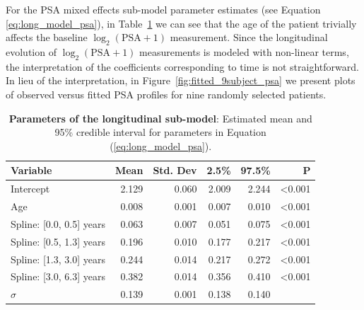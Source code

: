 For the PSA mixed effects sub-model parameter estimates (see Equation \ref{eq:long_model_psa}), in Table~\ref{tab:PSA_long} we can see that the age of the patient trivially affects the baseline ${\log_2(\mbox{PSA} + 1)}$ measurement. Since the longitudinal evolution of ${\log_2 (\mbox{PSA} + 1)}$ measurements is modeled with non-linear terms, the interpretation of the coefficients corresponding to time is not straightforward. In lieu of the interpretation, in Figure~\ref{fig:fitted_9subject_psa} we present plots of observed versus fitted PSA profiles for nine randomly selected patients. 
\begin{table}
\small\sf\centering
\caption{\textbf{Parameters of the longitudinal sub-model}: Estimated mean and 95\% credible interval for parameters in Equation (\ref{eq:long_model_psa}).}
\label{tab:PSA_long}
\begin{tabular}{lrrrrr}
\hline
Variable                         & Mean & Std. Dev & 2.5\%  & 97.5\% & P     \\
\hline
Intercept & 2.129    & 0.060  & 2.009 & 2.244 & \textless0.001 \\
Age & 0.008    & 0.001 & 0.007 & 0.010   &\textless0.001 \\
Spline: [0.0, 0.5] years & 0.063    & 0.007 & 0.051 & 0.075  & \textless0.001 \\
Spline: [0.5, 1.3] years & 0.196    & 0.010  & 0.177 & 0.217  & \textless0.001 \\
Spline: [1.3, 3.0] years & 0.244    & 0.014 & 0.217 & 0.272  & \textless0.001 \\
Spline: [3.0, 6.3] years & 0.382    & 0.014 & 0.356 & 0.410 &  \textless0.001 \\
$\sigma$ & 0.139    & 0.001 & 0.138 & 0.140  & \\
\hline
\end{tabular}
\end{table}

